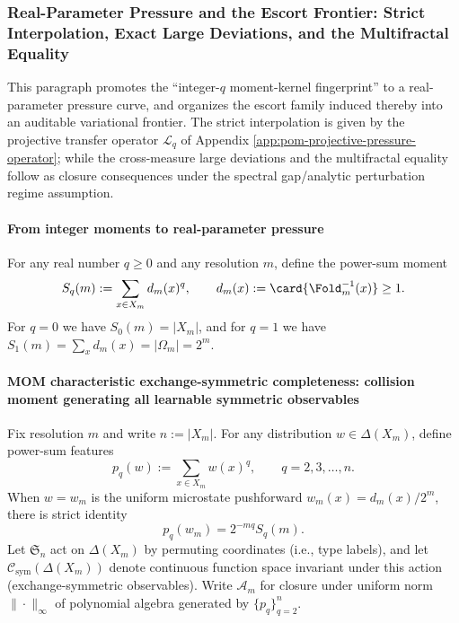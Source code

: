 \subsubsection{Real-Parameter Pressure and the Escort Frontier: Strict Interpolation, Exact Large Deviations, and the Multifractal Equality}\label{subsubsec:pom-real-q-pressure-thermo-frontier}
This paragraph promotes the ``integer-\(q\) moment-kernel fingerprint'' to a real-parameter pressure curve, and organizes the escort family induced thereby into an auditable variational frontier.
The strict interpolation is given by the projective transfer operator \(\mathcal{L}_q\) of Appendix \ref{app:pom-projective-pressure-operator};
while the cross-measure large deviations and the multifractal equality follow as closure consequences under the spectral gap/analytic perturbation regime assumption.

\paragraph{From integer moments to real-parameter pressure}
For any real number \(q\ge 0\) and any resolution \(m\), define the power-sum moment
\[
S_q(m):=\sum_{x\in X_m} d_m(x)^q,
\qquad
d_m(x):=\card{\Fold_m^{-1}(x)}\ge 1.
\]
For \(q=0\) we have \(S_0(m)=|X_m|\), and for \(q=1\) we have \(S_1(m)=\sum_x d_m(x)=|\Omega_m|=2^m\).

\paragraph{MOM characteristic exchange-symmetric completeness: collision moment generating all learnable symmetric observables}
Fix resolution \(m\) and write \(n:=|X_m|\).
For any distribution \(w\in\Delta(X_m)\), define power-sum features
\[
p_q(w):=\sum_{x\in X_m}w(x)^q,\qquad q=2,3,\dots,n.
\]
When \(w=w_m\) is the uniform microstate pushforward \(w_m(x)=d_m(x)/2^m\), there is strict identity
\[
p_q(w_m)=2^{-mq}S_q(m).
\]
Let \(\mathfrak{S}_{n}\) act on \(\Delta(X_m)\) by permuting coordinates (i.e., type labels),
and let \(\mathcal{C}_{\mathrm{sym}}(\Delta(X_m))\) denote continuous function space invariant under this action (exchange-symmetric observables).
Write \(\mathcal{A}_m\) for closure under uniform norm \(\|\cdot\|_\infty\) of polynomial algebra generated by \(\{p_q\}_{q=2}^{n}\).

